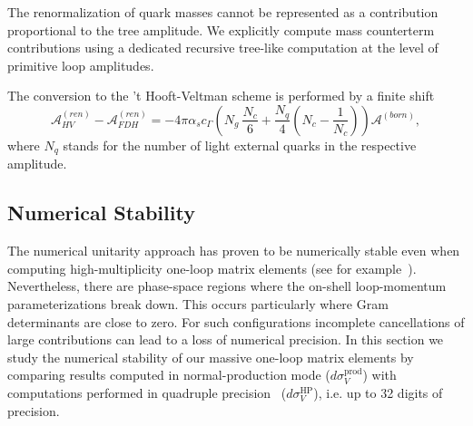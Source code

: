 The renormalization of quark masses cannot be represented as a contribution proportional to the tree amplitude. We explicitly
compute mass counterterm contributions using a dedicated recursive tree-like computation at the level of primitive loop amplitudes.

The conversion to the 't Hooft-Veltman scheme is performed by a finite shift~\cite{Signer:2008va}
%
\begin{equation}
  \mathcal{A}^{(ren)}_{HV} - \mathcal{A}^{(ren)}_{FDH} = -4\pi \alpha_s c_\Gamma\left(N_{g}~\frac{N_c}{6} + \frac{N_q}{4}\left(N_c -\frac{1}{N_c}\right)\right)\mathcal{A}^{(born)},
  \label{schemeshift}
\end{equation}
%
where $N_q$ stands for the number of light external quarks in the respective amplitude.


\subsection{Numerical Stability}
%
The numerical unitarity approach has proven to be numerically stable even when
computing high-multiplicity one-loop matrix elements (see for example~\cite{BH:W3jDistributions,BH:W5j}). Nevertheless,
there are phase-space regions where the on-shell loop-momentum parameterizations break down. This occurs particularly where Gram determinants are close
to zero. For such configurations incomplete cancellations of large contributions can
lead to a loss of numerical precision. 
In this section we study
the numerical stability of our  massive one-loop matrix elements by comparing
results computed in normal-production mode ($d\sigma_V^\mathrm{prod}$) with computations performed in
quadruple precision~\cite{QD} ($d\sigma_V^\mathrm{HP}$), i.e. up to 32 digits of precision.

